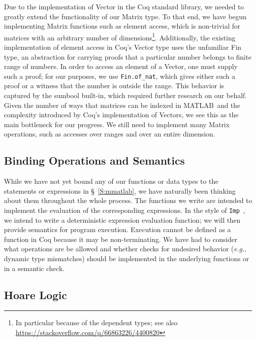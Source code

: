 \documentclass[11pt,conference]{IEEEtran}
\newcommand{\matlab}{MATLAB}
\theoremstyle{plain} %
\theoremstyle{definition}
\theoremstyle{remark}
\begin{document}
Due to the implementation of \textsf{Vector} in the Coq standard library, we
needed to greatly extend the functionality of our \textsf{Matrix} type. To that
end, we have begun implementing \textsf{Matrix} functions such as element
access, which is non-trivial for matrices with an arbitrary number of
dimensions\footnote{In particular because of the dependent types; see also
\url{https://stackoverflow.com/q/66863226/4400820}}. Additionally, the existing
implementation of element access in Coq's \textsf{Vector} type uses the
unfamiliar \textsf{Fin} type, an abstraction for carrying proofs that a
particular number belongs to finite range of numbers. In order to access an
element of a \textsf{Vector}, one must supply such a proof; for our purposes, we
use \texttt{Fin.of\_nat}, which gives either such a proof or a witness that the
number is outside the range. This behavior is captured by the \textsf{sumbool}
built-in, which required further research on our behalf. Given the number of
ways that matrices can be indexed in \matlab\ and the complexity introduced by
Coq's implementation of \textsf{Vector}s, we see this as the main bottleneck for
our progress. We still need to implement many \textsf{Matrix} operations, such
as accesses over ranges and over an entire dimension.

\subsection{Binding Operations and Semantics}

While we have not yet bound any of our functions or data types to the statements
or expressions in \S~\ref{S:mmatlab}, we have naturally been thinking about them
throughout the whole process. The functions we write are intended to implement
the evaluation of the corresponding expressions. In the style of
\texttt{Imp}~\cite{Pierce:SF1}, we intend to write a deterministic expression
evaluation function; we will then provide semantics for program execution.
Execution cannot be defined as a function in Coq because it may be
non-terminating. We have had to consider what operations are be allowed and
whether checks for undesired behavior (\emph{e.g.}, dynamic type mismatches)
should be implemented in the underlying functions or in a semantic check.

\subsection{Hoare Logic}
\end{document}
